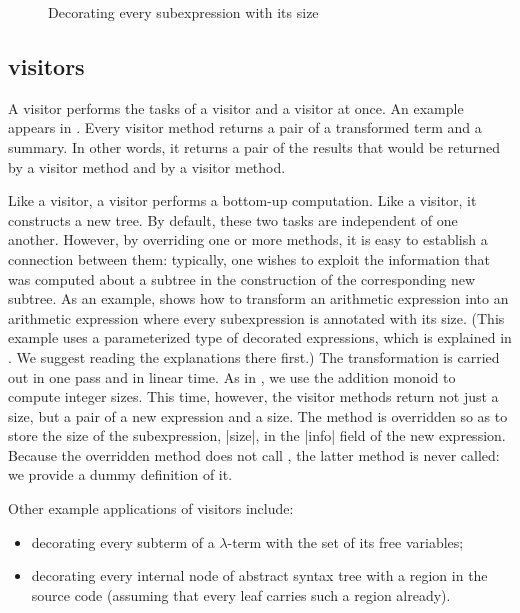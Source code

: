 \documentclass[11pt,a4paper,twoside]{article}
\begin{document}
\begin{figure}[p]
\caption{Decorating every subexpression with its size}
\label{fig:expr_info_mapreduce_use}
\end{figure}

\subsection{\mapreduce visitors}
\label{sec:intro:mapreduce}

A \mapreduce visitor performs the tasks of a \map visitor and a \reduce
visitor at once. An example appears in . Every visitor
method returns a pair of a transformed term and a summary. In other words,
it returns a pair of the results that would be returned by a \map visitor
method and by a \reduce visitor method.

Like a \reduce visitor, a \mapreduce visitor performs a bottom-up computation.
Like a \map visitor, it constructs a new tree. By default, these two tasks are
independent of one another. However, by overriding one or more methods, it is
easy to establish a connection between them: typically, one wishes to exploit
the information that was computed about a subtree in the construction of the
corresponding new subtree. As an example, 
shows how to transform an arithmetic expression into an arithmetic expression
where every subexpression is annotated with its size. (This example uses a
parameterized type of decorated expressions, which is explained in
. We suggest reading the explanations there
first.) The transformation is carried out in one pass and in linear time. As
in , we use the addition monoid to compute integer sizes.
This time, however, the visitor methods return not just a size, but a pair of
a new expression and a size. The method  is overridden so
as to store the size of the subexpression, \oc|size|, in the \oc|info| field
of the new expression. Because the overridden method  does
not call , the latter method is never called: we provide a
dummy definition of it.

Other example applications of \mapreduce visitors include:
\begin{itemize}[nosep]
\item decorating every subterm of a $\lambda$-term with the set of its free
  variables;
\item decorating every internal node of abstract syntax tree with a region in
  the source code (assuming that every leaf carries such a region already).
\end{itemize}
\end{document}
